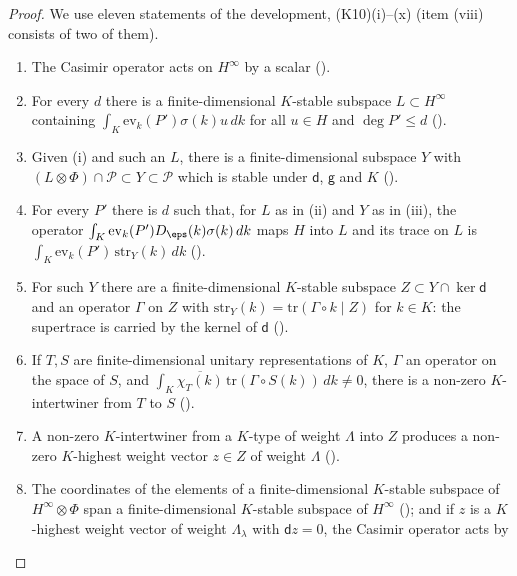 \begin{proof}
We use eleven statements of the development, (K10)(i)--(x) (item (viii) consists of two of them).
\begin{enumerate}[label=(\roman*)]
\item The Casimir operator acts on $H^\infty$ by a scalar
().
\item For every $d$ there is a finite-dimensional $K$-stable subspace $L\subset H^\infty$ containing
$\int_K\mathrm{ev}_k(P')\sigma(k)u\,dk$ for all $u\in H$ and $\deg P'\le d$
().
\item Given (i) and such an $L$, there is a finite-dimensional subspace $Y$ with $(L\otimes\Phi)\cap\mathcal P\subset
Y\subset\mathcal P$ which is stable under $\mathsf d$, $\mathsf g$ and $K$
().
\item For every $P'$ there is $d$ such that, for $L$ as in (ii) and $Y$ as in (iii), the operator
$\int_K\mathrm{ev}_k(P')D_\eps(k)\sigma(k)\,dk$ maps $H$ into $L$ and its trace on $L$ is
$\int_K\mathrm{ev}_k(P')\,\mathrm{str}_Y(k)\,dk$ ().
\item For such $Y$ there are a finite-dimensional $K$-stable subspace $Z\subset Y\cap\ker\mathsf d$ and an operator
$\Gamma$ on $Z$ with $\mathrm{str}_Y(k)=\mathrm{tr}(\Gamma\circ k\mid Z)$ for $k\in K$: the supertrace is carried by the
kernel of $\mathsf d$ ().
\item If $T,S$ are finite-dimensional unitary representations of $K$, $\Gamma$ an operator on the space of $S$, and
$\int_K\overline{\chi_T(k)}\,\mathrm{tr}(\Gamma\circ S(k))\,dk\ne0$, there is a non-zero $K$-intertwiner from $T$ to $S$
().
\item A non-zero $K$-intertwiner from a $K$-type of weight $\Lambda$ into $Z$ produces a non-zero $K$-highest weight vector
$z\in Z$ of weight $\Lambda$ ().
\item The coordinates of the elements of a finite-dimensional $K$-stable subspace of $H^\infty\otimes\Phi$ span a
finite-dimensional $K$-stable subspace of $H^\infty$ ();
and if $z$ is a $K$-highest weight vector of weight $\Lambda_\lambda$ with $\mathsf dz=0$, the Casimir operator acts by

\end{enumerate}
\end{proof}
